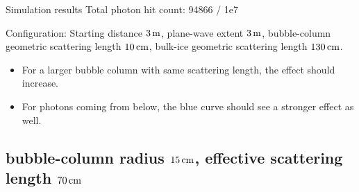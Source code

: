 \begin{frame}[fragile]{Simulation results}
  \tiny Total photon hit count: 94866 / 1e7

  \tiny Configuration: Starting distance $3\text{\,m}$, plane-wave extent $3\text{\,m}$, bubble-column geometric scattering length $10\text{\,cm}$, bulk-ice geometric scattering length $130\text{\,cm}$.
  \normalsize

  \begin{itemize}
    \item For a larger bubble column with same scattering length, the effect should increase. \checkmark
    \item For photons coming from below, the blue curve should see a stronger effect as well. \checkmark
  \end{itemize}
\end{frame}

\subsection{bubble-column radius $15\text{\,cm}$, effective scattering length $70\text{\,cm}$}
